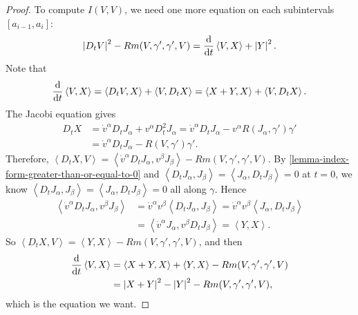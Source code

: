 \begin{proof}
  To compute \( I(V, V) \), we need one more equation on each subintervals \( [a_{i - 1}, a_i] \):
  \[
    \left\lvert D_t V \right\rvert^2 - Rm(V, \gamma', \gamma', V) = \frac{\mathop{}\!\mathrm{d}}{\mathop{}\!\mathrm{d} t}\left\langle V, X \right\rangle + \left\lvert Y \right\rvert^2.
  \]
  Note that
  \[
    \frac{\mathop{}\!\mathrm{d}}{\mathop{}\!\mathrm{d} t}\left\langle V, X \right\rangle = \left\langle D_t V, X \right\rangle + \left\langle V, D_t X \right\rangle = \left\langle X + Y, X \right\rangle + \left\langle V, D_t X \right\rangle.
  \]
  The Jacobi equation gives
  \begin{align*}
    D_t X &= \dot{v}^\alpha D_t J_\alpha + v^{\alpha}D^2_tJ_\alpha = \dot{v}^\alpha D_t J_\alpha - v^\alpha R(J_\alpha, \gamma')\gamma' \\
          &= \dot{v}^\alpha D_t J_\alpha - R(V, \gamma') \gamma'.
  \end{align*}
  Therefore, \( \left\langle D_t X, V \right\rangle = \left\langle \dot{v}^\alpha D_t J_\alpha, v^\beta J_\beta \right\rangle - Rm(V, \gamma', \gamma', V) \).
  By \ref{lemma-index-form-greater-than-or-equal-to-0} and \( \left\langle D_t J_\alpha, J_\beta \right\rangle = \left\langle J_\alpha, D_t J_\beta \right\rangle = 0 \) at \( t = 0 \), we know \( \left\langle D_t J_\alpha, J_\beta \right\rangle = \left\langle J_\alpha, D_t J_\beta \right\rangle = 0 \) all along \( \gamma \).
  Hence
  \begin{align*}
    \left\langle \dot{v}^\alpha D_t J_\alpha, v^\beta J_\beta \right\rangle &= \dot{v}^\alpha v^\beta \left\langle D_t J_\alpha, J_\beta \right\rangle = \dot{v}^\alpha v^\beta \left\langle J_\alpha, D_t J_\beta \right\rangle\\
                                                                            &= \left\langle \dot{v}^\alpha J_\alpha, v^\beta D_t J_\beta \right\rangle = \left\langle Y, X \right\rangle.
  \end{align*}
  So \( \left\langle D_t X, V \right\rangle = \left\langle Y, X \right\rangle - Rm(V, \gamma', \gamma', V) \), and then
  \begin{align*}
    \frac{\mathop{}\!\mathrm{d}}{\mathop{}\!\mathrm{d} t} \left\langle V, X \right\rangle &= \left\langle X + Y, X \right\rangle + \left\langle Y, X \right\rangle - Rm(V, \gamma', \gamma', V)\\
                                                        &= \left\lvert X + Y \right\rvert^2 - \left\lvert Y \right\rvert^2 - Rm(V, \gamma', \gamma', V),
  \end{align*}
  which is the equation we want.


\end{proof}
